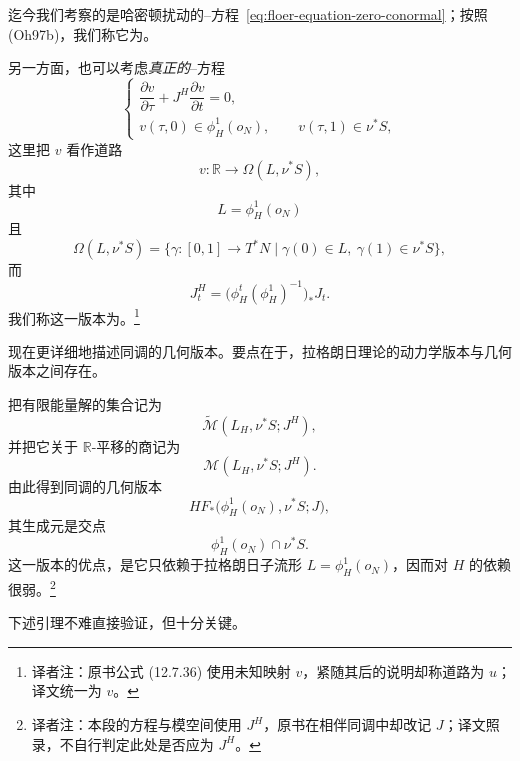 \section{\termDeformationOfFloerEquations{}}
\label{sec:deformation-of-floer-equations}

迄今我们考察的是哈密顿扰动的\personCauchy{}--\personRiemann{}方程~\eqref{eq:floer-equation-zero-conormal}；按照 (Oh97b)，我们称它为\emph{\termDynamicalVersion{}}。

另一方面，也可以考虑\emph{真正的}\personCauchy{}--\personRiemann{}方程
\begin{equation}
  \begin{cases}
    \dfrac{\partial v}{\partial\tau}
    +J^H\dfrac{\partial v}{\partial t}=0,\\[6pt]
    v(\tau,0)\in\phi_H^1(o_N),
    \qquad v(\tau,1)\in\nu^*S,
  \end{cases}
\label{eq:geometric-floer-equation}
\end{equation}
这里把 $v$ 看作道路
\[
  v:\mathbb R\longrightarrow\Omega(L,\nu^*S),
\]
其中
\[
  L=\phi_H^1(o_N)
\]
且
\[
  \Omega(L,\nu^*S)
  =\{\gamma:[0,1]\to T^*N
      \mid \gamma(0)\in L,\ \gamma(1)\in\nu^*S\},
\]
而
\[
  J_t^H
  =\bigl(\phi_H^t(\phi_H^1)^{-1}\bigr)_*J_t.
\]
我们称这一版本为\emph{\termGeometricVersion{}}。\footnote{译者注：原书公式 (12.7.36) 使用未知映射 $v$，紧随其后的说明却称道路为 $u$；译文统一为 $v$。}

现在更详细地描述\personFloer{}同调的几何版本。要点在于，拉格朗日\personFloer{}理论的动力学版本与几何版本之间存在\termFiltrationPreservingIsomorphism{}。

把有限能量解的集合记为
\[
  \widetilde{\mathcal M}(L_H,\nu^*S;J^H),
\]
并把它关于 $\mathbb R$-平移的商记为
\[
  \mathcal M(L_H,\nu^*S;J^H).
\]
由此得到\personFloer{}同调的几何版本
\[
  HF_*\bigl(\phi_H^1(o_N),\nu^*S;J\bigr),
\]
其生成元是交点
\[
  \phi_H^1(o_N)\cap\nu^*S.
\]
这一版本的优点，是它只依赖于拉格朗日子流形 $L=\phi_H^1(o_N)$，因而对 $H$ 的依赖很弱。\footnote{译者注：本段的方程与模空间使用 $J^H$，原书在相伴\personFloer{}同调中却改记 $J$；译文照录，不自行判定此处是否应为 $J^H$。}

下述引理不难直接验证，但十分关键。

